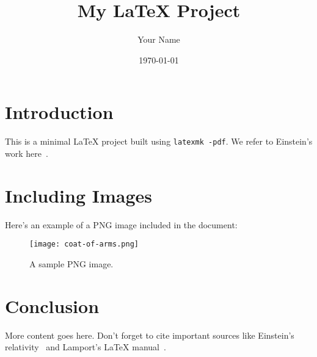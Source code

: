 \documentclass[a4paper,12pt]{article}
\title{My LaTeX Project}
\author{Your Name}
\date{\today}
\begin{document}
\maketitle

\tableofcontents
\newpage

\section{Introduction}
This is a minimal LaTeX project built using \texttt{latexmk -pdf}.  We refer to
Einstein's work here~\cite{einstein}.

\section{Including Images}

Here’s an example of a PNG image included in the document:

\begin{figure}[h]
    \centering
    \texttt{[image: coat-of-arms.png]}
    \caption{A sample PNG image.}
    \label{fig:pngimage}
\end{figure}

\section{Conclusion}
More content goes here. Don't forget to cite important sources like Einstein's
relativity~\cite{einstein} and Lamport's LaTeX manual~\cite{latex}.

\newpage


\end{document}
